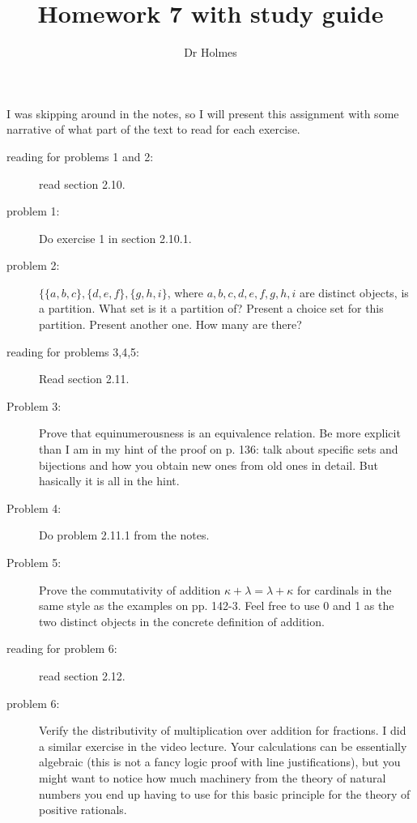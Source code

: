 \documentclass[12pt]{article}
\title{Homework 7 with study guide}
\author{Dr Holmes}
\begin{document}
\maketitle

I was skipping around in the notes, so I will present this assignment with some narrative of what part of the text to read for each exercise.

\begin{description}

\item[reading for problems 1 and 2:]  read section 2.10.

\item[problem 1:]  Do exercise 1 in section 2.10.1.

\item[problem 2:]  $\{\{a,b,c\},\{d,e,f\},\{g,h,i\}$, where $a,b,c,d,e,f,g,h,i$ are distinct objects, is a partition.  What set is it a partition of?  Present a choice set for this partition.  Present another one.  How many are there?


\item[reading for problems 3,4,5:]  Read section 2.11.

\item[Problem 3:]  Prove that equinumerousness is an equivalence relation.  Be more explicit than I am in my hint of the proof on p. 136:  talk about specific sets and bijections and how you obtain new ones from old ones in detail.  But hasically it is all in the hint.

\item[Problem 4:]  Do problem 2.11.1 from the notes.

\item[Problem 5:]  Prove the commutativity of addition $\kappa + \lambda = \lambda +\kappa$ for cardinals in the same style as the examples on pp. 142-3.  Feel free to use 0 and 1 as the two distinct objects in the concrete definition of addition.


\item[reading for problem 6:]  read section 2.12.

\item[problem 6:]   Verify the distributivity of multiplication over addition for fractions.  I did a similar exercise in the video lecture.  Your calculations can be essentially algebraic (this is not a fancy logic proof with line justifications), but you might want to notice how much machinery from the theory of natural numbers you end up having to use for this basic principle for the theory of positive rationals.


\end{description}
\end{document}
